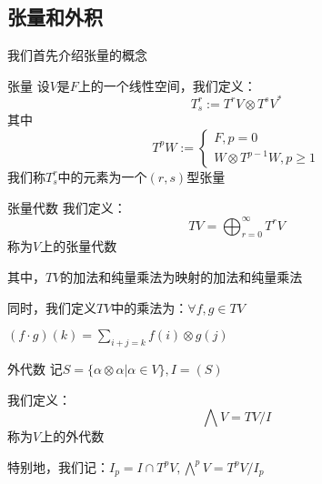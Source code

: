 \documentclass[12pt, a4paper, oneside, UTF8]{ctexbook}
\begin{document}
		\subsection{张量和外积}
			我们首先介绍张量的概念
			\begin{defn}{张量}{}
				设$V$是$F$上的一个线性空间，我们定义：
				\begin{equation}
					T_{s}^{r}:= T^{r} V \otimes T^{s} V^*
				\end{equation}
				其中
				\begin{equation}
					T^{p} W:= \begin{cases}
						F,p=0 \\
						W \otimes T^{p-1} W,p \geqslant 1
					\end{cases}
				\end{equation}
				我们称$T_{s}^{r}$中的元素为一个$(r,s)$型张量
			\end{defn}
			\begin{defn}{张量代数}{}
				我们定义：
				\begin{equation}
					TV = \bigoplus_{r=0}^{\infty} T^{r} V
				\end{equation}
				称为$V$上的张量代数

				其中，$TV$的加法和纯量乘法为映射的加法和纯量乘法

				同时，我们定义$TV$中的乘法为：$\forall f,g \in TV$

				$(f\cdot g)(k)=\sum\limits_{i+j=k} f(i) \otimes g(j)$
			\end{defn}
			\begin{defn}{外代数}{}
				记$S=\{\alpha \otimes \alpha |\alpha \in V\},I=(S)$

				我们定义：
				\begin{equation}
					\bigwedge  V = TV / I
				\end{equation}
				称为$V$上的外代数

				特别地，我们记：$I_p = I \cap T^{p} V,\bigwedge\limits^{p} V = T^{p}V/I_p$
			\end{defn}
\end{document}
